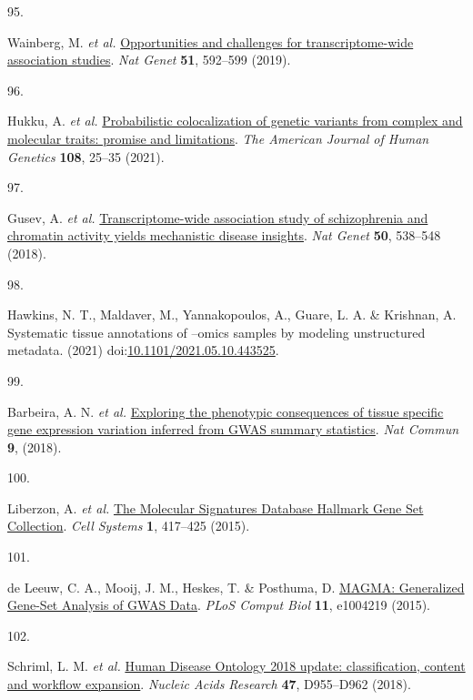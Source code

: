 \documentclass[
  a4paper,
]{article}
\newlength{\cslhangindent}
\newlength{\csllabelwidth}
\newlength{\cslentryspacingunit} %
\newenvironment{CSLReferences}[2] %
 {%
  \setlength{\parindent}{0pt}
  \ifodd #1
  \let\oldpar\par
  \def\par{\hangindent=\cslhangindent\oldpar}
  \fi
  \setlength{\parskip}{#2\cslentryspacingunit}
 }%
 {}
\newcommand{\CSLLeftMargin}[1]{\parbox[t]{\csllabelwidth}{#1}}
\newcommand{\CSLRightInline}[1]{\parbox[t]{\linewidth - \csllabelwidth}{#1}\break}
\begin{document}
\begin{CSLReferences}{0}{0}
\leavevmode{}%
\CSLLeftMargin{95. }%
\CSLRightInline{Wainberg, M. \emph{et al.} \href{https://doi.org/10.1038/s41588-019-0385-z}{Opportunities and challenges for transcriptome-wide association studies}. \emph{Nat Genet} \textbf{51}, 592--599 (2019).}

\leavevmode{}%
\CSLLeftMargin{96. }%
\CSLRightInline{Hukku, A. \emph{et al.} \href{https://doi.org/10.1016/j.ajhg.2020.11.012}{Probabilistic colocalization of genetic variants from complex and molecular traits: promise and limitations}. \emph{The American Journal of Human Genetics} \textbf{108}, 25--35 (2021).}

\leavevmode{}%
\CSLLeftMargin{97. }%
\CSLRightInline{Gusev, A. \emph{et al.} \href{https://doi.org/10.1038/s41588-018-0092-1}{Transcriptome-wide association study of schizophrenia and chromatin activity yields mechanistic disease insights}. \emph{Nat Genet} \textbf{50}, 538--548 (2018).}

\leavevmode{}%
\CSLLeftMargin{98. }%
\CSLRightInline{Hawkins, N. T., Maldaver, M., Yannakopoulos, A., Guare, L. A. \& Krishnan, A. Systematic tissue annotations of --omics samples by modeling unstructured metadata. (2021) doi:\href{https://doi.org/10.1101/2021.05.10.443525}{10.1101/2021.05.10.443525}.}

\leavevmode{}%
\CSLLeftMargin{99. }%
\CSLRightInline{Barbeira, A. N. \emph{et al.} \href{https://doi.org/10.1038/s41467-018-03621-1}{Exploring the phenotypic consequences of tissue specific gene expression variation inferred from GWAS summary statistics}. \emph{Nat Commun} \textbf{9}, (2018).}

\leavevmode{}%
\CSLLeftMargin{100. }%
\CSLRightInline{Liberzon, A. \emph{et al.} \href{https://doi.org/10.1016/j.cels.2015.12.004}{The Molecular Signatures Database Hallmark Gene Set Collection}. \emph{Cell Systems} \textbf{1}, 417--425 (2015).}

\leavevmode{}%
\CSLLeftMargin{101. }%
\CSLRightInline{de Leeuw, C. A., Mooij, J. M., Heskes, T. \& Posthuma, D. \href{https://doi.org/10.1371/journal.pcbi.1004219}{MAGMA: Generalized Gene-Set Analysis of GWAS Data}. \emph{PLoS Comput Biol} \textbf{11}, e1004219 (2015).}

\leavevmode{}%
\CSLLeftMargin{102. }%
\CSLRightInline{Schriml, L. M. \emph{et al.} \href{https://doi.org/10.1093/nar/gky1032}{Human Disease Ontology 2018 update: classification, content and workflow expansion}. \emph{Nucleic Acids Research} \textbf{47}, D955--D962 (2018).}


\end{CSLReferences}
\end{document}
